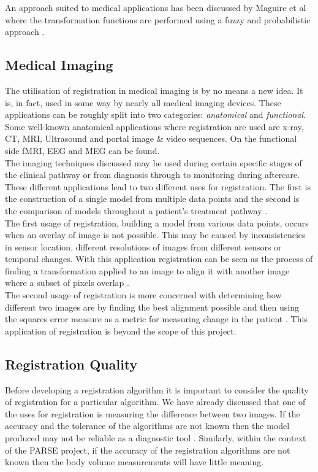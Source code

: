 An approach suited to medical applications has been discussed by Maguire et al \cite{maguire97} where the transformation functions are performed using a fuzzy and probabilistic approach \cite{brown92}. \\

\subsection{Medical Imaging}
The utilisation of registration in medical imaging is by no means a new idea. It is, in fact, used in some way by nearly all medical imaging devices. These applications can be roughly split into two categories: \emph{anatomical} and \emph{functional}. Some well-known anatomical applications where registration are used are x-ray, CT, MRI, Ultrasound and portal image & video sequences. On the functional side fMRI, EEG and MEG can be found. \\  

The imaging techniques discussed may be used during certain specific stages of the clinical pathway or from diagnosis through to monitoring during aftercare. These different applications lead to two different uses for registration. The first is the construction of a single model from multiple data points and the second is the comparison of models throughout a patient's treatment pathway \cite{maintz98}. \\

The first usage of registration, building a model from various data points, occurs when an overlay of image is not possible. This may be caused by inconsistencies in sensor location, different resolutions of images from different sensors or temporal changes. With this application registration can be seen as the process of finding a transformation applied to an image to align it with another image where a subset of pixels overlap \cite{maintz98}. \\

The second usage of registration is more concerned with determining how different two images are by finding the best alignment possible and then using the squares error measure as a metric for measuring change in the patient \cite{maintz98}. This application of registration is beyond the scope of this project.  \\

\subsection{Registration Quality}
Before developing a registration algorithm it is important to consider the quality of registration for a particular algorithm. We have already discussed that one of the uses for registration is measuring the difference between two images. If the accuracy and the tolerance of the algorithms are not known then the model produced may not be reliable as a diagnostic tool \cite{pennec98}. Similarly, within the context of the PARSE project, if the accuracy of the registration algorithms are not known then the body volume measurements will have little meaning. \\

